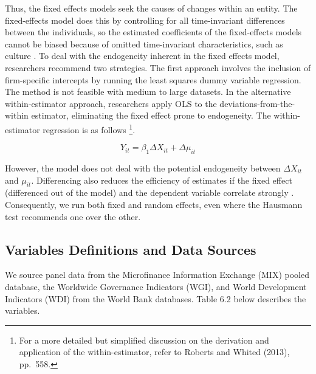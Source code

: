 \documentclass[a4paper, nobind]{templates/ociamthesis}
\begin{document}
Thus, the fixed effects models seek the causes of changes within an entity. The fixed-effects model does this by controlling for all time-invariant differences between the individuals, so the estimated coefficients of the fixed-effects models cannot be biased because of omitted time-invariant characteristics, such as culture \autocite{torres2007panel}. To deal with the endogeneity inherent in the fixed effects model, researchers recommend two strategies. The first approach involves the inclusion of firm-specific intercepts by running the least squares dummy variable regression. The method is not feasible with medium to large datasets. In the alternative within-estimator approach, researchers apply OLS to the deviations-from-the-within estimator, eliminating the fixed effect prone to endogeneity. The within-estimator regression is as follows \footnote{For a more detailed but simplified discussion on the derivation and application of the within-estimator, refer to Roberts and Whited (2013), pp.~558.}.

\begin{equation}
Y_{it} = \beta_{1} \Delta X_{it} + \Delta \mu_{it}
\end{equation}

However, the model does not deal with the potential endogeneity between \(\Delta X_{it}\) and \(\mu_{it}\). Differencing also reduces the efficiency of estimates if the fixed effect (differenced out of the model) and the dependent variable correlate strongly \autocite{clark2015should}. Consequently, we run both fixed and random effects, even where the Hausmann test recommends one over the other.

\hypertarget{variables-definitions-and-data-sources}{%
\subsection{Variables Definitions and Data Sources}\label{variables-definitions-and-data-sources}}

We source panel data from the Microfinance Information Exchange (MIX) pooled database, the Worldwide Governance Indicators (WGI), and World Development Indicators (WDI) from the World Bank databases. Table 6.2 below describes the variables.

\begingroup\fontsize{9}{11}\selectfont
\end{document}
